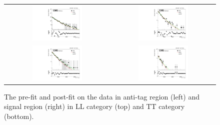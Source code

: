 \begin{itemize}
\begin{figure}[t]
  \centering
 \begin{tabular}{cc}
    \includegraphics[width=0.5\textwidth]{Figures/aa/anti_LL.pdf} &
   \includegraphics[width=0.5\textwidth]{Figures/aa/data_LL.pdf} \\
   \includegraphics[width=0.5\textwidth]{Figures/aa/anti_TT.pdf} &
   \includegraphics[width=0.5\textwidth]{Figures/aa/data_TT.pdf}
  \end{tabular}
  \caption{The pre-fit and post-fit on the data in anti-tag region (left) and signal region (right) in LL category (top) and TT category (bottom).}
\label{fig:47}
\end{figure}

\end{itemize}
